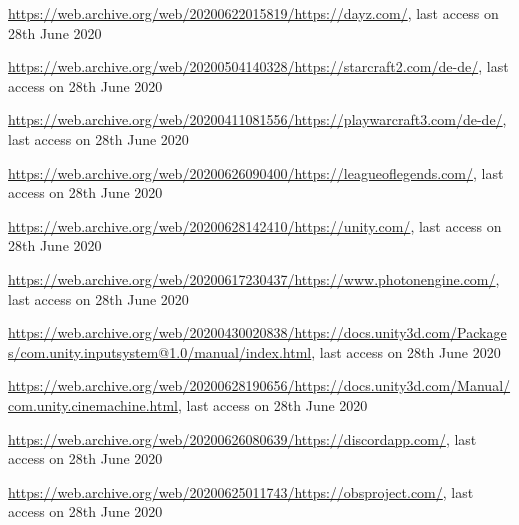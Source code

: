 \begin{appendices}
\url{https://web.archive.org/web/20200622015819/https://dayz.com/}, last access on 28th June 2020

\url{https://web.archive.org/web/20200504140328/https://starcraft2.com/de-de/}, last access on 28th June 2020

\url{https://web.archive.org/web/20200411081556/https://playwarcraft3.com/de-de/}, last access on 28th June 2020

\url{https://web.archive.org/web/20200626090400/https://leagueoflegends.com/}, last access on 28th June 2020

\url{https://web.archive.org/web/20200628142410/https://unity.com/}, last access on 28th June 2020

\url{https://web.archive.org/web/20200617230437/https://www.photonengine.com/}, last access on 28th June 2020

\url{https://web.archive.org/web/20200430020838/https://docs.unity3d.com/Packages/com.unity.inputsystem@1.0/manual/index.html}, last access on 28th June 2020

\url{https://web.archive.org/web/20200628190656/https://docs.unity3d.com/Manual/com.unity.cinemachine.html}, last access on 28th June 2020

\url{https://web.archive.org/web/20200626080639/https://discordapp.com/}, last access on 28th June 2020

\url{https://web.archive.org/web/20200625011743/https://obsproject.com/}, last access on 28th June 2020

\end{appendices}
